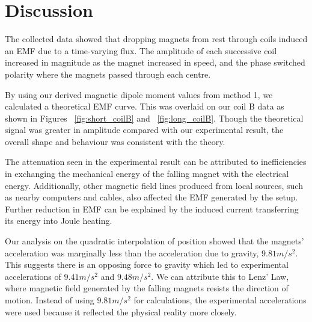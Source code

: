 \section{Discussion}\label{sec:discussion}



The collected data showed that dropping magnets from rest through coils induced an EMF due to a time-varying flux.
The amplitude of each successive coil increased in magnitude as the magnet increased in speed, and the phase switched polarity where the magnets passed through each centre.

By using our derived magnetic dipole moment values from method 1, we calculated a theoretical EMF curve.
This was overlaid on our coil B data as shown in Figures ~\ref{fig:short_coilB} and ~\ref{fig:long_coilB}.
Though the theoretical signal was greater in amplitude compared with our experimental result, the overall shape and
behaviour was consistent with the theory.

\bigskip

The attenuation seen in the experimental result can be attributed to inefficiencies in exchanging the mechanical
energy of the falling magnet with the electrical energy.
Additionally, other magnetic field lines produced from local sources, such as nearby computers and cables, also
affected the EMF
generated by
the
setup.
Further reduction in EMF can be explained by the induced current transferring its energy into Joule heating.

\bigskip

Our analysis on the quadratic interpolation of position showed that the magnets' acceleration was marginally less
than the acceleration due to gravity, $9.81 m/s^2$.
This suggests there is an opposing force to gravity which led to experimental accelerations of $9.41 m/s^2$ and
$9.48 m/s^2$.
We can attribute this to Lenz' Law, where magnetic field generated by the falling magnets resists the direction of
motion.
Instead of using $9.81 m/s^2$ for calculations, the experimental accelerations were used because it
reflected the physical reality more closely.


